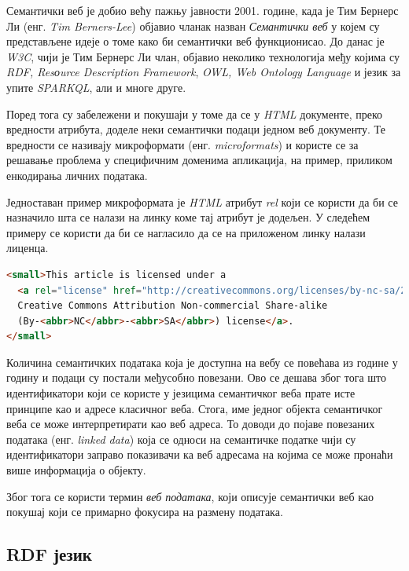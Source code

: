 \documentclass[12pt,oneside]{memoir}
\begin{document}
Семантички веб је добио већу пажњу јавности 2001. године, када је Тим Бернерс Ли (енг. \textit{Tim Berners-Lee}) објавио чланак назван \textit{Семантички веб} у којем су представљене идеје о томе како би семантички веб функционисао. До данас је \textit{W3C}, чији је Тим Бернерс Ли члан, објавио неколико технологија међу којима су \textit{RDF, Resоurce Description Framework}, \textit{OWL, Web Ontology Language} и језик за упите \textit{SPARKQL}, али и многе друге. \cite{semantic}

Поред тога су забележени и покушаји у томе да се у \textit{HTML} документе, преко вредности атрибута, доделе неки семантички подаци једном веб документу. Те вредности се називају микроформати (енг. \textit{microformats}) и користе се за решавање проблема у специфичним доменима апликација, на пример, приликом енкодирања личних података. \cite{semantic}

Једноставан пример микроформата је \textit{HTML} атрибут \textit{rel} који се користи да би се назначило шта се налази на линку коме тај атрибут је додељен. У следећем примеру се користи да би се нагласило да се на приложеном линку налази лиценца.

\begin{lstlisting}[language=HTML]
<small>This article is licensed under a 
  <a rel="license" href="http://creativecommons.org/licenses/by-nc-sa/2.0/">
  Creative Commons Attribution Non-commercial Share-alike 
  (By-<abbr>NC</abbr>-<abbr>SA</abbr>) license</a>.
</small>
\end{lstlisting}

Количина семантичких података која је доступна на вебу се повећава из године у годину и подаци су постали међусобно повезани. Ово се дешава због тога што идентификатори који се користе у језицима семантичког веба прате исте принципе као и адресе класичног веба. Стога, име једног објекта семантичког веба се може интерпретирати као веб адреса. То доводи до појаве повезаних података (енг. \textit{linked data}) која се односи на семантичке податке чији су идентификатори заправо показивачи ка веб адресама на којима се може пронаћи више информација о објекту. \cite{semantic}

Због тога се користи термин \textit{веб података}, који описује семантички веб као покушај који се примарно фокусира на размену података. 

\subsection{RDF језик}
\label{subsec:semantic_rdf}
\end{document}
